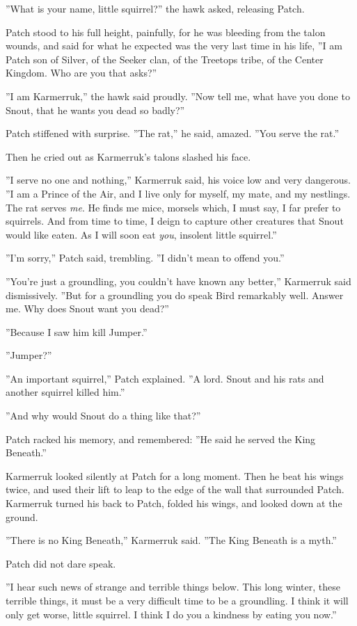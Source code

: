 \documentclass[12pt]{book}
\begin{document}
''What is your name, little squirrel?'' the hawk asked, releasing Patch.

Patch stood to his full height, painfully, for he was bleeding from the talon wounds, and said for what he expected was the very last time in his life, ''I am Patch son of Silver, of the Seeker clan, of the Treetops tribe, of the Center Kingdom. Who are you that asks?''

''I am Karmerruk,'' the hawk said proudly. ''Now tell me, what have you done to Snout, that he wants you dead so badly?''

Patch stiffened with surprise. ''The rat,'' he said, amazed. ''You serve the rat.''

Then he cried out as Karmerruk's talons slashed his face.

''I serve no one and nothing,'' Karmerruk said, his voice low and very dangerous. ''I am a Prince of the Air, and I live only for myself, my mate, and my nestlings. The rat serves {\it me}. He finds me mice, morsels which, I must say, I far prefer to squirrels. And from time to time, I deign to capture other creatures that Snout would like eaten. As I will soon eat {\it you}, insolent little squirrel.''

''I'm sorry,'' Patch said, trembling. ''I didn't mean to offend you.''

''You're just a groundling, you couldn't have known any better,'' Karmerruk said dismissively. ''But for a groundling you do speak Bird remarkably well. Answer me. Why does Snout want you dead?''

''Because I saw him kill Jumper.''

''Jumper?''

''An important squirrel,'' Patch explained. ''A lord. Snout and his rats and another squirrel killed him.''

''And why would Snout do a thing like that?''

Patch racked his memory, and remembered: ''He said he served the King Beneath.''

Karmerruk looked silently at Patch for a long moment. Then he beat his wings twice, and used their lift to leap to the edge of the wall that surrounded Patch. Karmerruk turned his back to Patch, folded his wings, and looked down at the ground.

''There is no King Beneath,'' Karmerruk said. ''The King Beneath is a myth.''

Patch did not dare speak.

''I hear such news of strange and terrible things below. This long winter, these terrible things, it must be a very difficult time to be a groundling. I think it will only get worse, little squirrel. I think I do you a kindness by eating you now.''
\end{document}

